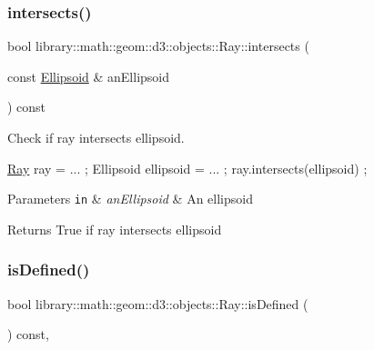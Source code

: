 \subsubsection{\texorpdfstring{intersects()}{intersects()}\hspace{0.1cm}{\footnotesize\ttfamily [3/3]}}
{\footnotesize\ttfamily bool library\+::math\+::geom\+::d3\+::objects\+::\+Ray\+::intersects (\begin{DoxyParamCaption}\item[{const \hyperlink{classlibrary_1_1math_1_1geom_1_1d3_1_1objects_1_1_ellipsoid}{Ellipsoid} \&}]{an\+Ellipsoid }\end{DoxyParamCaption}) const}



Check if ray intersects ellipsoid. 


\begin{DoxyCode}
\hyperlink{classlibrary_1_1math_1_1geom_1_1d3_1_1objects_1_1_ray_a11b7613464daaebc6e25a758b057f203}{Ray} ray = ... ;
Ellipsoid ellipsoid = ... ;
ray.intersects(ellipsoid) ;
\end{DoxyCode}



\begin{DoxyParams}[1]{Parameters}
\mbox{\tt in}  & {\em an\+Ellipsoid} & An ellipsoid \\
\hline
\end{DoxyParams}
\begin{DoxyReturn}{Returns}
True if ray intersects ellipsoid 
\end{DoxyReturn}
\mbox{\label{classlibrary_1_1math_1_1geom_1_1d3_1_1objects_1_1_ray_a7329f77a549a02e9c27d07c11adcc8bf}} 
\subsubsection{\texorpdfstring{is\+Defined()}{isDefined()}}
{\footnotesize\ttfamily bool library\+::math\+::geom\+::d3\+::objects\+::\+Ray\+::is\+Defined (\begin{DoxyParamCaption}{ }\end{DoxyParamCaption}) const\hspace{0.3cm}{\ttfamily [override]}, {\ttfamily [virtual]}}



